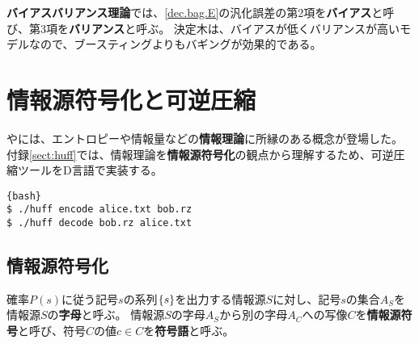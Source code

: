 \documentclass[10pt,a4paper]{book}
\begin{document}
\textbf{バイアスバリアンス理論}では、\eqref{dec.bag.E}の汎化誤差の第2項を\textbf{バイアス}と呼び、第3項を\textbf{バリアンス}と呼ぶ。
決定木は、バイアスが低くバリアンスが高いモデルなので、ブースティングよりもバギングが効果的である。

\section{情報源符号化と可逆圧縮\label{sect:huff}}

やには、エントロピーや\nKL 情報量などの\textbf{情報理論}に所縁のある概念が登場した。
付録\ref{sect:huff}では、情報理論を\textbf{情報源符号化}の観点から理解するため、可逆圧縮ツール\huff{}をD言語で実装する。

\begin{Verbatim}{bash}
$ ./huff encode alice.txt bob.rz
$ ./huff decode bob.rz alice.txt
\end{Verbatim}

\subsection{情報源符号化}

確率$P(s)$に従う記号$s$の系列$\seq{s}$を出力する情報源$S$に対し、記号$s$の集合$A_S$を情報源$S$の\textbf{字母}と呼ぶ。
情報源$S$の字母$A_S$から別の字母$A_C$への写像$C$を\textbf{情報源符号}と呼び、符号$C$の値$c\!\in\!C$を\textbf{符号語}と呼ぶ。

\begin{table}[h]
\centering
\caption{source coding examples.\label{tab:huff}}
\quad
{}
\end{table}
\end{document}
